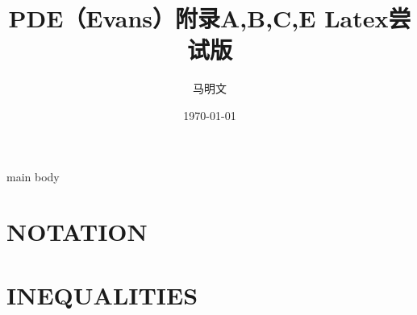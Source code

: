 \documentclass[leqno]{article}%
\title{PDE（Evans）附录A,B,C,E Latex尝试版}
\author{马明文}
\date{\today}
\begin{document}
\maketitle
\newpage
main body %


\appendix

\renewcommand{\thesection}{APPENDIX~\Alph{section}:}
\renewcommand{\thesubsection}{\Alph{section}.\arabic{subsection}.}
\section{NOTATION}
\section{INEQUALITIES}
\end{document}
